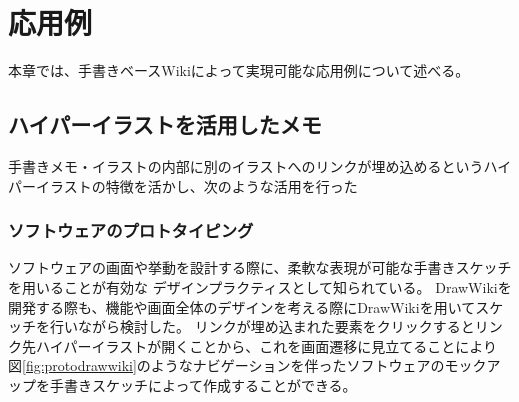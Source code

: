 \chapter{応用例}
\label{chap:ouyou}

本章では、手書きベースWikiによって実現可能な応用例について述べる。

\newpage

%

\section{ハイパーイラストを活用したメモ}
手書きメモ・イラストの内部に別のイラストへのリンクが埋め込めるというハイパーイラストの特徴を活かし、次のような活用を行った

\subsection{ソフトウェアのプロトタイピング}
ソフトウェアの画面や挙動を設計する際に、柔軟な表現が可能な手書きスケッチを用いることが有効な
デザインプラクティスとして知られている。
DrawWikiを開発する際も、機能や画面全体のデザインを考える際にDrawWikiを用いてスケッチを行いながら検討した。
リンクが埋め込まれた要素をクリックするとリンク先ハイパーイラストが開くことから、これを画面遷移に見立てることにより
図\ref{fig:protodrawwiki}のようなナビゲーションを伴ったソフトウェアのモックアップを手書きスケッチによって作成することができる。

